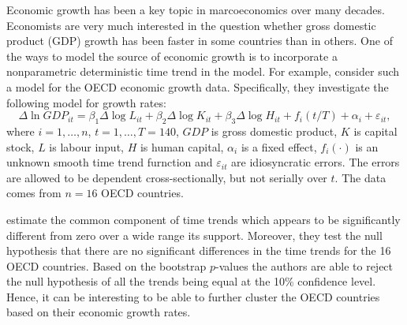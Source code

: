 \documentclass[a4paper,12pt]{article}
\begin{document}
\begin{example}
Economic growth has been a key topic in marcoeconomics over many decades. Economists are very much interested in the question whether gross domestic product (GDP) growth  has been faster in some countries than in others. One of the ways to model the source of economic growth is to incorporate a nonparametric deterministic time trend in the model. For example, \cite{Zhang2012} consider such a model for the OECD economic growth data. Specifically, they investigate the following model for growth rates:
\begin{equation}\label{model-zhang}
\Delta \ln GDP_{it} = \beta_1 \Delta \log L_{it} +\beta_2 \Delta \log K_{it} +\beta_3 \Delta \log H_{it} +f_i(t/T) +\alpha_i + \varepsilon_{it},
\end{equation}
where $i = 1,\ldots, n$, $t = 1, \ldots, T = 140$, $GDP$ is gross domestic product, $K$ is capital stock, $L$ is labour input, $H$ is human capital, $\alpha_i$ is a fixed effect, $f_i(\cdot)$ is an unknown smooth time trend furnction and $\varepsilon_{it}$ are idiosyncratic errors. The errors are allowed to be dependent cross-sectionally, but not serially over $t$. The data comes from $n = 16$ OECD countries.

\cite{Zhang2012} estimate the common component of time trends which appears to be significantly different from zero over a wide range its support. Moreover, they test the null hypothesis that there are no significant differences in the time trends for the 16 OECD countries. Based on the bootstrap $p$-values the authors are able to reject the null hypothesis of all the trends being equal at the 10\% confidence level. Hence, it can be interesting to be able to further cluster the OECD countries based on their economic growth rates.
\end{example}
\end{document}
